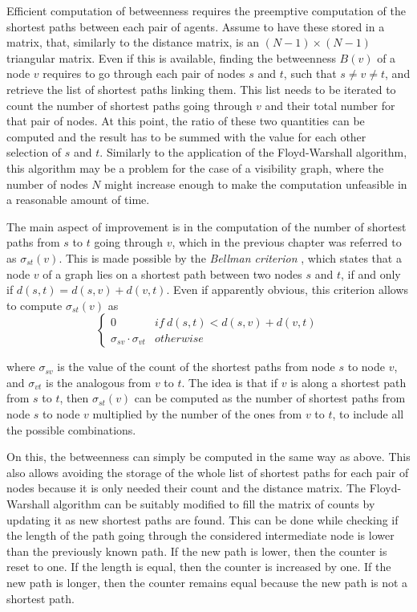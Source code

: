 Efficient computation of betweenness requires the preemptive computation
of the shortest paths between each pair of agents. Assume to have
these stored in a matrix, that, similarly to the distance matrix,
is an $\left(N-1\right)\times\left(N-1\right)$ triangular matrix.
Even if this is available, finding the betweenness $B\left(v\right)$
of a node $v$ requires to go through each pair of nodes $s$ and
$t$, such that $s\neq v\neq t$, and retrieve the list of shortest
paths linking them. This list needs to be iterated to count the number
of shortest paths going through $v$ and their total number for that
pair of nodes. At this point, the ratio of these two quantities can
be computed and the result has to be summed with the value for each
other selection of $s$ and $t$. Similarly to the application of
the Floyd-Warshall algorithm, this algorithm may be a problem for
the case of a visibility graph, where the number of nodes $N$ might
increase enough to make the computation unfeasible in a reasonable
amount of time. 

The main aspect of improvement is in the computation of the number
of shortest paths from $s$ to $t$ going through $v$, which in the
previous chapter was referred to as $\sigma_{st}\left(v\right)$.
This is made possible by the \emph{Bellman criterion} \cite{Brandes2001}, 
which states that a node $v$ of a graph lies on a shortest path between two nodes
$s$ and $t$, if and only if $d\left(s,t\right)=d\left(s,v\right)+d(v,t)$.
Even if apparently obvious, this criterion allows to compute $\sigma_{st}\left(v\right)$
as 
\[
\begin{cases}
0 & if\ d\left(s,t\right)<d\left(s,v\right)+d\left(v,t\right)\\
\sigma_{sv}\cdot\sigma_{vt} & otherwise
\end{cases}
\]

where $\sigma_{sv}$ is the value of the count of the shortest paths
from node $s$ to node $v$, and $\sigma_{vt}$ is the analogous from
$v$ to $t$. The idea is that if $v$ is along a shortest path from
$s$ to $t$, then $\sigma_{st}\left(v\right)$ can be computed as
the number of shortest paths from node $s$ to node $v$ multiplied
by the number of the ones from $v$ to $t$, to include all the possible
combinations.

On this, the betweenness can simply be computed in the same way as
above. This also allows avoiding the storage of the whole list of
shortest paths for each pair of nodes because it is only needed their
count and the distance matrix. The Floyd-Warshall algorithm can be
suitably modified to fill the matrix of counts by updating it as new
shortest paths are found. This can be done while checking if the length
of the path going through the considered intermediate node is lower
than the previously known path. If the new path is lower, then the
counter is reset to one. If the length is equal, then the counter
is increased by one. If the new path is longer, then the counter remains
equal because the new path is not a shortest path. 


